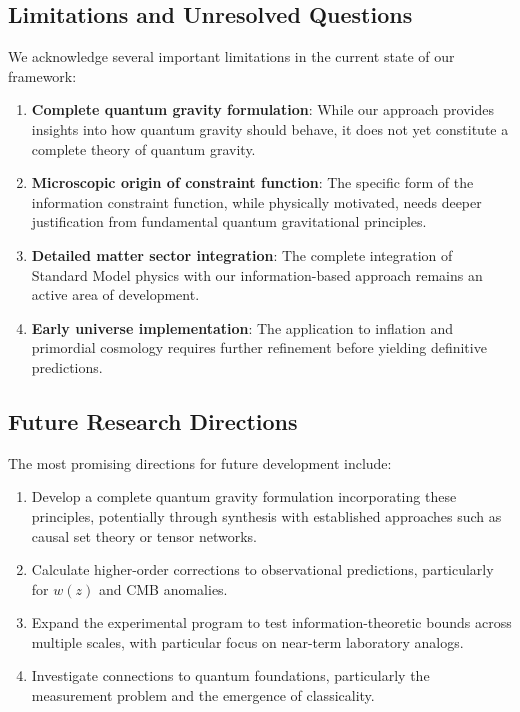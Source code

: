 \documentclass[12pt]{article}
\theoremstyle{plain}
\theoremstyle{definition}
\theoremstyle{remark}
\begin{document}
\subsection{Limitations and Unresolved Questions}

We acknowledge several important limitations in the current state of our framework:

\begin{enumerate}
\item \textbf{Complete quantum gravity formulation}: While our approach provides insights into how quantum gravity should behave, it does not yet constitute a complete theory of quantum gravity.

\item \textbf{Microscopic origin of constraint function}: The specific form of the information constraint function, while physically motivated, needs deeper justification from fundamental quantum gravitational principles.

\item \textbf{Detailed matter sector integration}: The complete integration of Standard Model physics with our information-based approach remains an active area of development.

\item \textbf{Early universe implementation}: The application to inflation and primordial cosmology requires further refinement before yielding definitive predictions.
\end{enumerate}

\subsection{Future Research Directions}

The most promising directions for future development include:

\begin{enumerate}
\item Develop a complete quantum gravity formulation incorporating these principles, potentially through synthesis with established approaches such as causal set theory or tensor networks.

\item Calculate higher-order corrections to observational predictions, particularly for $w(z)$ and CMB anomalies.

\item Expand the experimental program to test information-theoretic bounds across multiple scales, with particular focus on near-term laboratory analogs.

\item Investigate connections to quantum foundations, particularly the measurement problem and the emergence of classicality.
\end{enumerate}
\end{document}
